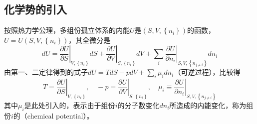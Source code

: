 \documentclass[main.tex]{subfiles}
\begin{document}
\subsection{化学势的引入}
按照热力学公理，多组份孤立体系的内能$U$是$\left(S, V,\left\{n_i\right\}\right)$的函数，$U=U\left(S,V,\left\{n_i\right\}\right)$，其全微分是
\[dU=\left.\frac{\partial U}{\partial S}\right|_{V,\left\{n_i\right\}}dS+\left.\frac{\partial U}{\partial V}\right|_{S,\left\{n_i\right\}}dV+\sum_i\left.\frac{\partial U}{\partial n_i}\right|_{S,V,\left\{n_{j\neq i}\right\}}dn_i\]
由第一、二定律得到的式子$dU=TdS-pdV+\sum_i\mu_idn_i$（可逆过程），比较得
\[T=\left.\frac{\partial U}{\partial S}\right|_{V,\left\{n_i\right\}},\quad-p=\left.\frac{\partial U}{\partial V}\right|_{S,\left\{n_i\right\}},\quad\mu_i\equiv\left.\frac{\partial U}{\partial n_i}\right|_{S,V,\left\{n_{j\neq i}\right\}}\]
其中$\mu_i$是此处引入的，表示由于组份$i$的分子数变化$dn_i$所造成的内能变化，称为组份$i$的（chemical potential）。
\end{document}
